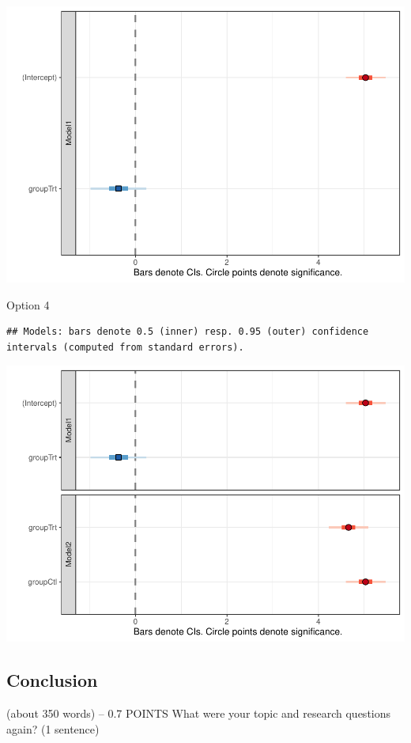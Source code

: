 \documentclass[
  man]{apa6}
\begin{document}
\includegraphics{tawab_backup_report_files/figure-latex/model 3-1.pdf}

Option 4

\begin{verbatim}
## Models: bars denote 0.5 (inner) resp. 0.95 (outer) confidence intervals (computed from standard errors).
\end{verbatim}

\includegraphics{tawab_backup_report_files/figure-latex/model 4-1.pdf}

\hypertarget{conclusion}{%
\subsection{Conclusion}\label{conclusion}}

(about 350 words) -- 0.7 POINTS What were your topic and research
questions again? (1 sentence)
\end{document}
